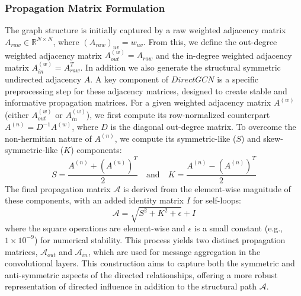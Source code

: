 \documentclass[utf8]{FrontiersinHarvard}
\begin{document}
	\subsubsection{Propagation Matrix Formulation}
	The graph structure is initially captured by a raw weighted adjacency matrix $A_{raw} \in \mathbb{R}^{N \times N}$, where $(A_{raw})_{uv} = w_{uv}$. From this, we define the out-degree weighted adjacency matrix $A_{out}^{(w)} = A_{raw}$ and the in-degree weighted adjacency matrix $A_{in}^{(w)} = A_{raw}^T$. In addition we also generate the structural symmetric undirected adjacency $A$. A key component of $DirectGCN$ is a specific preprocessing step for these adjacency matrices, designed to create stable and informative propagation matrices. For a given weighted adjacency matrix $A^{(w)}$ (either $A_{out}^{(w)}$ or $A_{in}^{(w)}$), we first compute its row-normalized counterpart $A^{(n)} = D^{-1}A^{(w)}$, where $D$ is the diagonal out-degree matrix. To overcome the non-hermitian nature of $A^{(n)}$, we compute its symmetric-like ($S$) and skew-symmetric-like ($K$) components:
	\begin{equation}
		S = \frac{A^{(n)} + (A^{(n)})^T}{2} \quad \text{and} \quad K = \frac{A^{(n)} - (A^{(n)})^T}{2} 
	\end{equation}
	The final propagation matrix $\mathcal{A}$ is derived from the element-wise magnitude of these components, with an added identity matrix $I$ for self-loops:
	\begin{equation}
		\mathcal{A} = \sqrt{S^2 + K^2 + \epsilon} + I 
	\end{equation}
	where the square operations are element-wise and $\epsilon$ is a small constant (e.g., $1 \times 10^{-9}$) for numerical stability. This process yields two distinct propagation matrices, $\mathcal{A}_{out}$ and $\mathcal{A}_{in}$, which are used for message aggregation in the convolutional layers. This construction aims to capture both the symmetric and anti-symmetric aspects of the directed relationships, offering a more robust representation of directed influence in addition to the structural path $\mathcal{A}$.
	
\end{document}
